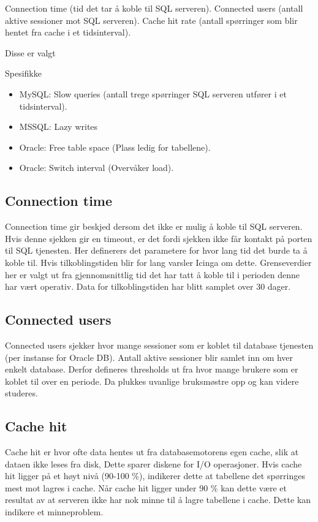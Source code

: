 Connection time (tid det tar å koble til SQL serveren).
Connected users (antall aktive sessioner mot SQL serveren).
Cache hit rate (antall spørringer som blir hentet fra cache i et tidsinterval).

Disse er valgt

Spesifikke
\begin{itemize}
\item MySQL: Slow queries (antall trege spørringer SQL serveren utfører i et tidsinterval).
\item MSSQL: Lazy writes
\item Oracle: Free table space (Plass ledig for tabellene).
\item Oracle: Switch interval (Overvåker load).
\end{itemize}

\subsection*{Connection time}
Connection time gir beskjed dersom det ikke er mulig å koble til SQL serveren. Hvis denne sjekken gir en timeout, er det fordi sjekken ikke får kontakt på porten til SQL tjenesten. Her definerers det parametere for hvor lang tid det burde ta å koble til. Hvis tilkoblingstiden blir for lang varsler Icinga om dette. Grenseverdier her er valgt ut fra gjennomsnittlig tid det har tatt å koble til i perioden denne har vært operativ. Data for tilkoblingstiden har blitt samplet over 30 dager.

\subsection*{Connected users}
Connected users sjekker hvor mange sessioner som er koblet til database tjenesten (per instanse for Oracle DB). Antall aktive sessioner blir samlet inn om hver enkelt database. Derfor defineres thresholds ut fra hvor mange brukere som er koblet til over en periode. Da plukkes uvanlige bruksmøstre opp og kan videre studeres.

\subsection*{Cache hit}
Cache hit er hvor ofte data hentes ut fra databasemotorens egen cache, slik at dataen ikke leses fra disk, Dette sparer diskene for I/O operasjoner. Hvis cache hit ligger på et høyt nivå (90-100 \%), indikerer dette at tabellene det spørringes mest mot lagres i cache. Når cache hit ligger under 90 \% kan dette være et resultat av at serveren ikke har nok minne til å lagre tabellene i cache. Dette kan indikere et minneproblem.

